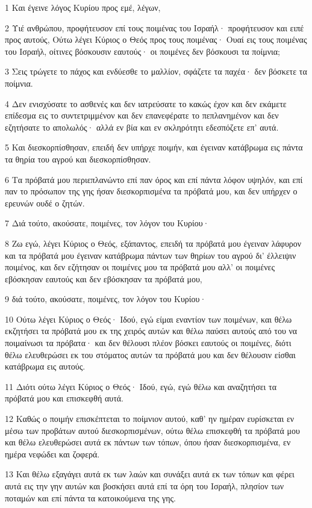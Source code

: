 \par 1 Και έγεινε λόγος Κυρίου προς εμέ, λέγων,
\par 2 Υιέ ανθρώπου, προφήτευσον επί τους ποιμένας του Ισραήλ· προφήτευσον και ειπέ προς αυτούς, Ούτω λέγει Κύριος ο Θεός προς τους ποιμένας· Ουαί εις τους ποιμένας του Ισραήλ, οίτινες βόσκουσιν εαυτούς· οι ποιμένες δεν βόσκουσι τα ποίμνια;
\par 3 Σεις τρώγετε το πάχος και ενδύεσθε το μαλλίον, σφάζετε τα παχέα· δεν βόσκετε τα ποίμνια.
\par 4 Δεν ενισχύσατε το ασθενές και δεν ιατρεύσατε το κακώς έχον και δεν εκάμετε επίδεσμα εις το συντετριμμένον και δεν επανεφέρατε το πεπλανημένον και δεν εζητήσατε το απολωλός· αλλά εν βία και εν σκληρότητι εδεσπόζετε επ' αυτά.
\par 5 Και διεσκορπίσθησαν, επειδή δεν υπήρχε ποιμήν, και έγειναν κατάβρωμα εις πάντα τα θηρία του αγρού και διεσκορπίσθησαν.
\par 6 Τα πρόβατά μου περιεπλανώντο επί παν όρος και επί πάντα λόφον υψηλόν, και επί παν το πρόσωπον της γης ήσαν διεσκορπισμένα τα πρόβατά μου, και δεν υπήρχεν ο ερευνών ουδέ ο ζητών.
\par 7 Διά τούτο, ακούσατε, ποιμένες, τον λόγον του Κυρίου·
\par 8 Ζω εγώ, λέγει Κύριος ο Θεός, εξάπαντος, επειδή τα πρόβατά μου έγειναν λάφυρον και τα πρόβατά μου έγειναν κατάβρωμα πάντων των θηρίων του αγρού δι' έλλειψιν ποιμένος, και δεν εζήτησαν οι ποιμένες μου τα πρόβατά μου αλλ' οι ποιμένες εβόσκησαν εαυτούς και δεν εβόσκησαν τα πρόβατά μου,
\par 9 διά τούτο, ακούσατε, ποιμένες, τον λόγον του Κυρίου·
\par 10 Ούτω λέγει Κύριος ο Θεός· Ιδού, εγώ είμαι εναντίον των ποιμένων, και θέλω εκζητήσει τα πρόβατά μου εκ της χειρός αυτών και θέλω παύσει αυτούς από του να ποιμαίνωσι τα πρόβατα· και δεν θέλουσι πλέον βόσκει εαυτούς οι ποιμένες, διότι θέλω ελευθερώσει εκ του στόματος αυτών τα πρόβατά μου και δεν θέλουσιν είσθαι κατάβρωμα εις αυτούς.
\par 11 Διότι ούτω λέγει Κύριος ο Θεός· Ιδού, εγώ, εγώ θέλω και αναζητήσει τα πρόβατά μου και επισκεφθή αυτά.
\par 12 Καθώς ο ποιμήν επισκέπτεται το ποίμνιον αυτού, καθ' ην ημέραν ευρίσκεται εν μέσω των προβάτων αυτού διεσκορπισμένων, ούτω θέλω επισκεφθή τα πρόβατά μου και θέλω ελευθερώσει αυτά εκ πάντων των τόπων, όπου ήσαν διεσκορπισμένα, εν ημέρα νεφώδει και ζοφερά.
\par 13 Και θέλω εξαγάγει αυτά εκ των λαών και συνάξει αυτά εκ των τόπων και φέρει αυτά εις την γην αυτών και βοσκήσει αυτά επί τα όρη του Ισραήλ, πλησίον των ποταμών και επί πάντα τα κατοικούμενα της γης.
